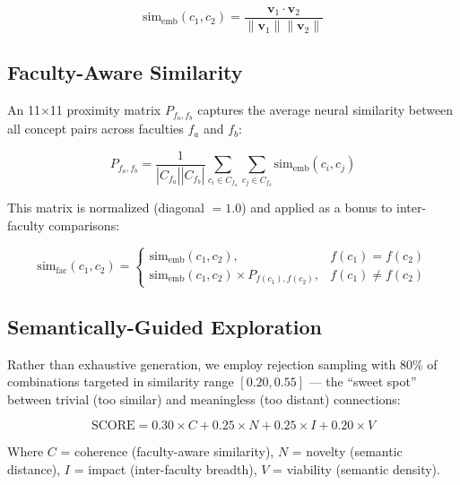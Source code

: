 \documentclass[a4paper,12pt]{article}
\begin{document}
\begin{equation}
    \text{sim}_\text{emb}(c_1, c_2) = \frac{\mathbf{v}_1 \cdot \mathbf{v}_2}
    {\|\mathbf{v}_1\| \|\mathbf{v}_2\|}
    \label{eq:cosine}
\end{equation}

\subsection{Faculty-Aware Similarity}

An 11$\times$11 proximity matrix $P_{f_a,f_b}$ captures the average neural similarity 
between all concept pairs across faculties $f_a$ and $f_b$:

\begin{equation}
    P_{f_a,f_b} = \frac{1}{|C_{f_a}||C_{f_b}|} 
    \sum_{c_i \in C_{f_a}} \sum_{c_j \in C_{f_b}} \text{sim}_\text{emb}(c_i, c_j)
\end{equation}

This matrix is normalized (diagonal $= 1.0$) and applied as a bonus to inter-faculty 
comparisons:

\begin{equation}
    \text{sim}_\text{fac}(c_1, c_2) = 
    \begin{cases}
        \text{sim}_\text{emb}(c_1, c_2), & f(c_1) = f(c_2) \\
        \text{sim}_\text{emb}(c_1, c_2) \times P_{f(c_1),f(c_2)}, & f(c_1) \neq f(c_2)
    \end{cases}
\end{equation}

\subsection{Semantically-Guided Exploration}

Rather than exhaustive generation, we employ rejection sampling with 80\% of combinations 
targeted in similarity range $[0.20, 0.55]$ --- the ``sweet spot'' between trivial 
(too similar) and meaningless (too distant) connections:

\begin{equation}
    \text{SCORE} = 0.30 \times C + 0.25 \times N + 0.25 \times I + 0.20 \times V
    \label{eq:score}
\end{equation}

Where $C$ = coherence (faculty-aware similarity), $N$ = novelty (semantic distance), 
$I$ = impact (inter-faculty breadth), $V$ = viability (semantic density).
\end{document}
